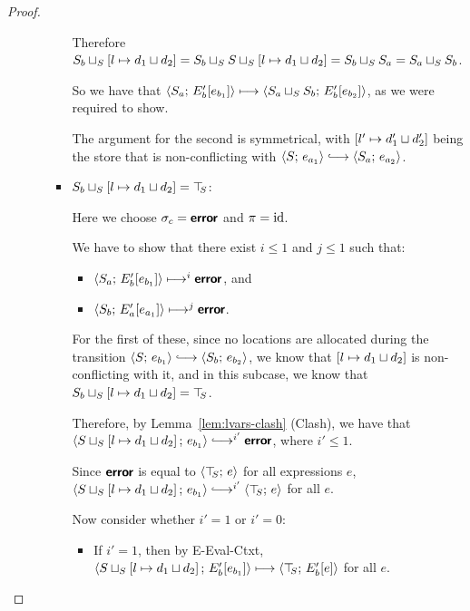 \begin{proof}
\begin{enumerate}
\begin{enumerate}
\begin{itemize}
        Therefore
        $S_b \sqcup_{S} \left[ l \mapsto d_1 \sqcup d_2 \right]
        =
        S_b \sqcup_{S} S \sqcup_{S} \left[ l \mapsto d_1 \sqcup d_2 \right]
        = S_b \sqcup_{S} S_a = S_a \sqcup_{S} S_b$.

        So we have that $\langle S_a;\, E'_b\hspace{-0.5mm}\left[e_{b_1}\right] \rangle
        \longmapsto
        \langle S_a \sqcup_{S} S_b;\, E'_b\hspace{-0.5mm}\left[e_{b_2}\right] \rangle$, as we
        were required to show.

        The argument for the second is symmetrical, with
        $\left[ l' \mapsto d'_1 \sqcup d'_2 \right]$ being the
        store that is non-conflicting with $\config{S}{e_{a_1}}
        \parstepsto \config{S_a}{e_{a_2}}$.

      \item
        $S_b \sqcup_{S} \left[ l \mapsto d_1 \sqcup d_2 \right]
        = \top\hspace{-0.85mm}_{S}$:

        Here we choose $\sigma_c = \textbf{\textsf{error}}$ and $\pi = \mathrm{id}$.

        We have to show that there exist $i \leq 1$ and $j \leq 1$
        such that:
        \begin{itemize}
        \item $\langle S_a;\, E'_b\hspace{-0.5mm}\left[e_{b_1}\right] \rangle \longmapsto^i
          \textbf{\textsf{error}}$, and
        \item $\langle S_b;\, E'_a\hspace{-0.5mm}\left[e_{a_1}\right] \rangle \longmapsto^j
          \textbf{\textsf{error}}$.
        \end{itemize}

        For the first of these, since no locations are allocated
        during the transition $\config{S}{e_{b_1}} \parstepsto
        \config{S_b}{e_{b_2}}$, we know that
        $\left[ l \mapsto d_1 \sqcup d_2 \right]$ is
        non-conflicting with it, and in this subcase, we know that
        $S_b \sqcup_{S} \left[ l \mapsto d_1 \sqcup d_2 \right]
        = \top\hspace{-0.85mm}_{S}$.

        Therefore, by Lemma~\ref{lem:lvars-clash} (Clash), we have
        that
        $\config{\lubstore{S}{\store{\storebindingRaw{l}{\userlub{d_1}{d_2}}}}}{e_{b_1}}
        \parstepsto^{i'} \error$, where $i' \leq 1$.

        Since $\textbf{\textsf{error}}$ is equal to $\langle \top\hspace{-0.85mm}_{S};\, e \rangle$ for all
        expressions $e$,
        $\config{\lubstore{S}{\store{\storebindingRaw{l}{\userlub{d_1}{d_2}}}}}{e_{b_1}}
        \parstepsto^{i'} \config{\topS}{e}$ for all $e$.

        Now consider whether $i' = 1$ or $i' = 0$:
        \begin{itemize}
        \item If $i' = 1$, then by {\sc E-Eval-Ctxt},
          $\langle S \sqcup_{S} \left[ l \mapsto d_1 \sqcup d_2 \right];\, E'_b\hspace{-0.5mm}\left[e_{b_1}\right] \rangle
          \longmapsto \langle \top\hspace{-0.85mm}_{S};\, E'_b\hspace{-0.5mm}\left[e\right] \rangle$ for all
          $e$.


\end{itemize}
\end{itemize}
\end{enumerate}
\end{enumerate}
\end{proof}
